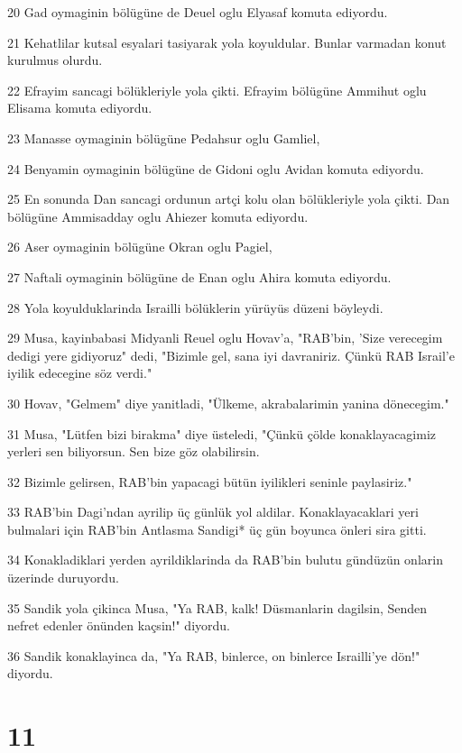 \par 20 Gad oymaginin bölügüne de Deuel oglu Elyasaf komuta ediyordu.
\par 21 Kehatlilar kutsal esyalari tasiyarak yola koyuldular. Bunlar varmadan konut kurulmus olurdu.
\par 22 Efrayim sancagi bölükleriyle yola çikti. Efrayim bölügüne Ammihut oglu Elisama komuta ediyordu.
\par 23 Manasse oymaginin bölügüne Pedahsur oglu Gamliel,
\par 24 Benyamin oymaginin bölügüne de Gidoni oglu Avidan komuta ediyordu.
\par 25 En sonunda Dan sancagi ordunun artçi kolu olan bölükleriyle yola çikti. Dan bölügüne Ammisadday oglu Ahiezer komuta ediyordu.
\par 26 Aser oymaginin bölügüne Okran oglu Pagiel,
\par 27 Naftali oymaginin bölügüne de Enan oglu Ahira komuta ediyordu.
\par 28 Yola koyulduklarinda Israilli bölüklerin yürüyüs düzeni böyleydi.
\par 29 Musa, kayinbabasi Midyanli Reuel oglu Hovav'a, "RAB'bin, 'Size verecegim dedigi yere gidiyoruz" dedi, "Bizimle gel, sana iyi davraniriz. Çünkü RAB Israil'e iyilik edecegine söz verdi."
\par 30 Hovav, "Gelmem" diye yanitladi, "Ülkeme, akrabalarimin yanina dönecegim."
\par 31 Musa, "Lütfen bizi birakma" diye üsteledi, "Çünkü çölde konaklayacagimiz yerleri sen biliyorsun. Sen bize göz olabilirsin.
\par 32 Bizimle gelirsen, RAB'bin yapacagi bütün iyilikleri seninle paylasiriz."
\par 33 RAB'bin Dagi'ndan ayrilip üç günlük yol aldilar. Konaklayacaklari yeri bulmalari için RAB'bin Antlasma Sandigi* üç gün boyunca önleri sira gitti.
\par 34 Konakladiklari yerden ayrildiklarinda da RAB'bin bulutu gündüzün onlarin üzerinde duruyordu.
\par 35 Sandik yola çikinca Musa, "Ya RAB, kalk! Düsmanlarin dagilsin, Senden nefret edenler önünden kaçsin!" diyordu.
\par 36 Sandik konaklayinca da, "Ya RAB, binlerce, on binlerce Israilli'ye dön!" diyordu.

\chapter{11}

